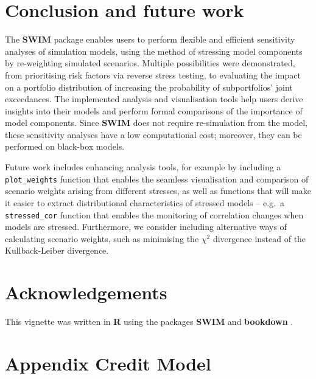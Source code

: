 \documentclass[
]{article}
\begin{document}
\hypertarget{conclusion-and-future-work}{%
\section{Conclusion and future work}\label{conclusion-and-future-work}}

The \textbf{SWIM} package enables users to perform flexible and efficient sensitivity analyses of simulation models, using the method of stressing model components by re-weighting simulated scenarios. Multiple possibilities were demonstrated, from prioritising risk factors via reverse stress testing, to evaluating the impact on a portfolio distribution of increasing the probability of subportfolios' joint exceedances. The implemented analysis and visualisation tools help users derive insights into their models and perform formal comparisons of the importance of model components. Since \textbf{SWIM} does not require re-simulation from the model, these sensitivity analyses have a low computational cost; moreover, they can be performed on black-box models.

Future work includes enhancing analysis tools, for example by including a \texttt{plot\_weights} function that enables the seamless visualisation and comparison of scenario weights arising from different stresses, as well as functions that will make it easier to extract distributional characteristics of stressed models -- e.g.~a \texttt{stressed\_cor} function that enables the monitoring of correlation changes when models are stressed. Furthermore, we consider including alternative ways of calculating scenario weights, such as minimising the \(\chi^2\) divergence instead of the Kullback-Leiber divergence.

\hypertarget{acknowledgements}{%
\section*{Acknowledgements}\label{acknowledgements}}

This vignette was written in \textbf{R} \citep{R-base} using the packages \textbf{SWIM} \citep{PesentiR} and \textbf{bookdown} \citep{R-bookdown}.

\hypertarget{appendix-appendix}{%
\appendix}


\hypertarget{AppendixCM}{%
\section{Appendix Credit Model}\label{AppendixCM}}
\end{document}
